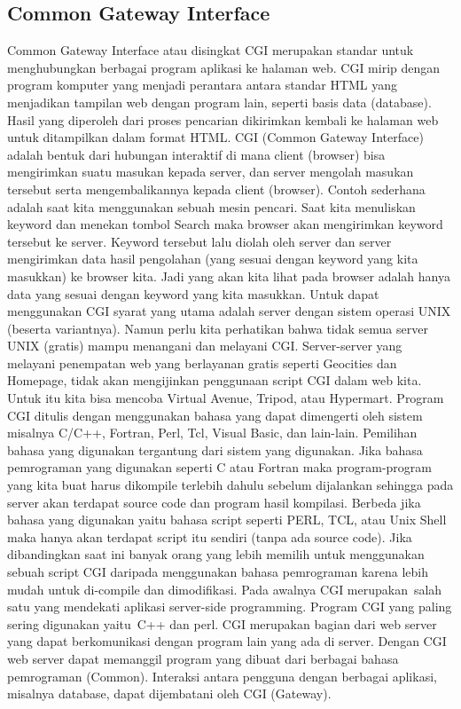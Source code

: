 \subsection{Common Gateway Interface}
Common Gateway Interface atau disingkat CGI merupakan standar untuk menghubungkan berbagai program aplikasi ke halaman web. CGI mirip dengan program komputer yang menjadi perantara antara standar HTML yang menjadikan tampilan web dengan program lain, seperti basis data (database). Hasil yang diperoleh dari proses pencarian dikirimkan kembali ke halaman web untuk ditampilkan dalam format HTML. CGI (Common Gateway Interface) adalah bentuk dari hubungan interaktif di mana client (browser) bisa mengirimkan suatu masukan kepada server, dan server mengolah masukan tersebut serta mengembalikannya kepada client (browser). Contoh sederhana adalah saat kita menggunakan sebuah mesin pencari. Saat kita menuliskan keyword dan menekan tombol Search maka browser akan mengirimkan keyword tersebut ke server. Keyword tersebut lalu diolah oleh server dan server mengirimkan data hasil pengolahan (yang sesuai dengan keyword yang kita masukkan) ke browser kita. Jadi yang akan kita lihat pada browser adalah  hanya data yang sesuai dengan keyword yang kita masukkan. 
Untuk dapat menggunakan CGI syarat yang utama adalah server dengan sistem operasi UNIX (beserta variantnya). Namun perlu kita perhatikan bahwa tidak semua server UNIX (gratis) mampu menangani dan melayani CGI. Server-server yang melayani penempatan web yang berlayanan gratis seperti Geocities dan Homepage, tidak akan mengijinkan penggunaan script CGI dalam web kita. Untuk itu kita bisa mencoba Virtual Avenue, Tripod, atau Hypermart.
	Program CGI ditulis dengan menggunakan bahasa yang dapat dimengerti oleh sistem misalnya C/C++, Fortran, Perl, Tcl, Visual Basic, dan lain-lain. Pemilihan bahasa yang digunakan tergantung dari sistem yang digunakan. Jika bahasa pemrograman yang digunakan seperti C atau Fortran maka program-program yang kita buat harus dikompile terlebih dahulu sebelum dijalankan sehingga pada server akan terdapat source code dan program hasil kompilasi. Berbeda jika bahasa yang digunakan yaitu bahasa script seperti PERL, TCL, atau Unix Shell maka hanya akan terdapat script itu sendiri (tanpa ada source code). Jika dibandingkan saat ini banyak orang yang lebih memilih untuk menggunakan sebuah script CGI daripada menggunakan bahasa pemrograman karena lebih mudah untuk di-compile dan dimodifikasi.  
	Pada awalnya CGI merupakan~salah satu yang mendekati aplikasi server-side programming.  Program CGI yang paling sering digunakan yaitu~C++ dan perl.  CGI merupakan bagian dari web server yang dapat berkomunikasi dengan program lain yang ada di server. Dengan CGI web server dapat memanggil program yang dibuat dari berbagai bahasa pemrograman (Common). Interaksi antara pengguna dengan berbagai aplikasi, misalnya database, dapat dijembatani oleh CGI (Gateway). 
